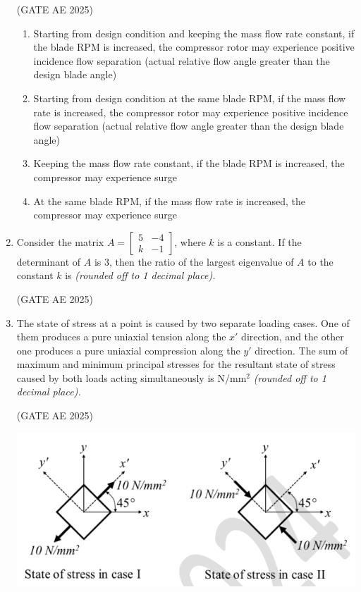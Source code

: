 \documentclass[journal,12pt,onecolumn]{IEEEtran}
\theoremstyle{remark}
\begin{document}
\begin{flushleft}
\begin{enumerate}
\hfill (GATE AE 2025)

\begin{enumerate}
\item Starting from design condition and keeping the mass flow rate constant, if the blade RPM is increased, the compressor rotor may experience positive incidence flow separation (actual relative flow angle greater than the design blade angle)  
\item Starting from design condition at the same blade RPM, if the mass flow rate is increased, the compressor rotor may experience positive incidence flow separation (actual relative flow angle greater than the design blade angle)  
\item Keeping the mass flow rate constant, if the blade RPM is increased, the compressor may experience surge  
\item At the same blade RPM, if the mass flow rate is increased, the compressor may experience surge  
\end{enumerate}

\item Consider the matrix $A = \begin{bmatrix} 5 & -4 \\ k & -1 \end{bmatrix}$, where $k$ is a constant. If the determinant of $A$ is 3, then the ratio of the largest eigenvalue of $A$ to the constant $k$ is \underline{\hspace{3cm}} \textit{(rounded off to 1 decimal place).} 

\hfill (GATE AE 2025)

\item The state of stress at a point is caused by two separate loading cases. One of them produces a pure uniaxial tension along the $x'$ direction, and the other one produces a pure uniaxial compression along the $y'$ direction. The sum of maximum and minimum principal stresses for the resultant state of stress caused by both loads acting simultaneously is \underline{\hspace{3cm}} N/mm$^2$ \textit{(rounded off to 1 decimal place).}

\hfill (GATE AE 2025)

\begin{center}
\includegraphics[width=0.8\columnwidth]{figs/52.png}


\end{center}
\end{enumerate}
\end{flushleft}
\end{document}
